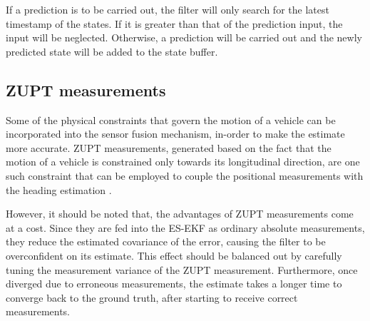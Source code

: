 If a prediction is to be carried out, the filter will only search for the latest timestamp of the states. If it is greater than that of the prediction input, the input will be neglected. Otherwise, a prediction will be carried out and the newly predicted state will be added to the state buffer.



\subsection{\acrlong{ZUPT} measurements}
Some of the physical constraints that govern the motion of a vehicle can be incorporated into the sensor fusion mechanism, in-order to make the estimate more accurate. \gls{ZUPT} measurements, generated based on the fact that the motion of a vehicle is constrained only towards its longitudinal direction, are one such constraint that can be employed to couple the positional measurements with the heading estimation \cite{pa:Dissanayake2001ZUPT}. 

However, it should be noted that, the advantages of \gls{ZUPT} measurements come at a cost. Since they are fed into the \gls{ES-EKF} as ordinary absolute measurements, they reduce the estimated covariance of the error, causing the filter to be overconfident on its estimate. This effect should be balanced out by carefully tuning the measurement variance of the \gls{ZUPT} measurement. Furthermore, once diverged due to erroneous measurements, the estimate takes a longer time to converge back to the ground truth, after starting to receive correct measurements.








